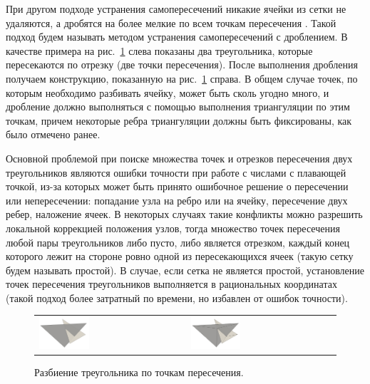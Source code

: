 При другом подходе устранения самопересечений никакие ячейки из сетки не удаляются, а дробятся на более мелкие по всем точкам пересечения \cite{Skorkovska2018Int}.
Такой подход будем называть методом устранения самопересечений с дроблением.
В качестве примера на рис.~\ref{fig:text_1_int_tri_cut} слева показаны два треугольника, которые пересекаются по отрезку (две точки пересечения).
После выполнения дробления получаем конструкцию, показанную на рис.~\ref{fig:text_1_int_tri_cut} справа.
В общем случае точек, по которым необходимо разбивать ячейку, может быть сколь угодно много, и дробление должно выполняться с помощью выполнения триангуляции по этим точкам, причем некоторые ребра триангуляции должны быть фиксированы, как было отмечено ранее.

Основной проблемой при поиске множества точек и отрезков пересечения двух треугольников являются ошибки точности при работе с числами с плавающей точкой, из-за которых может быть принято ошибочное решение о пересечении или непересечении: попадание узла на ребро или на ячейку, пересечение двух ребер, наложение ячеек.
В некоторых случаях такие конфликты можно разрешить локальной коррекцией положения узлов, тогда множество точек пересечения любой пары треугольников либо пусто, либо является отрезком, каждый конец которого лежит на стороне ровно одной из пересекающихся ячеек (такую сетку будем называть простой).
В случае, если сетка не является простой, установление точек пересечения треугольников выполняется в рациональных координатах (такой подход более затратный по времени, но избавлен от ошибок точности).

\begin{figure}[ht]
\centering
\begin{tabular}{ll}
\includegraphics[width=0.35\textwidth]{fig/int_before_cut.png}
&
\includegraphics[width=0.35\textwidth]{fig/int_after_cut.png}
\end{tabular}
\singlespacing
{}\caption{Разбиение треугольника по точкам пересечения.}
\label{fig:text_1_int_tri_cut}
\end{figure}

